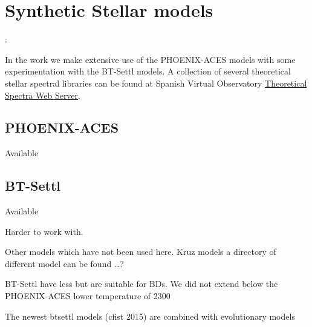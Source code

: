 
\section{Synthetic Stellar models}:

In the work we make extensive use of the {PHOENIX-ACES} models with some experimentation with the {BT-Settl} models.
A collection of several theoretical stellar spectral libraries can be found at Spanish Virtual Observatory \href{http://svo2.cab.inta-csic.es/theory/newov/index.php}{Theoretical Spectra Web Server}.



\subsection{PHOENIX-ACES}

Available 




\subsection{BT-Settl}
\label{subsec:btsettl}
Available 

Harder to work with.

Other models which have not been used here.
Kruz models a directory of different model can be found \ldots{}?

BT-Settl have less but are suitable for BDs.
We did not extend below the {PHOENIX-ACES} lower temperature of 2300\K{}


The newest btsettl models (cfist 2015) are combined with evolutionary models~\citep{barrafe_evolutionary_2015}